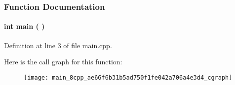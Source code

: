 \begin{appendices}
  
  
\subsubsection{\-Function \-Documentation}
\paragraph[{main}]{\setlength{\rightskip}{0pt plus 5cm}int {\bf main} (
)}\label{main_8cpp_ae66f6b31b5ad750f1fe042a706a4e3d4}


\-Definition at line 3 of file main.\-cpp.



\-Here is the call graph for this function\-:\nopagebreak
\begin{figure}[H]
\begin{center}
\leavevmode
\texttt{[image: main\_8cpp\_ae66f6b31b5ad750f1fe042a706a4e3d4\_cgraph]}
\end{center}
\end{figure}



  
  
  
  
\end{appendices}

